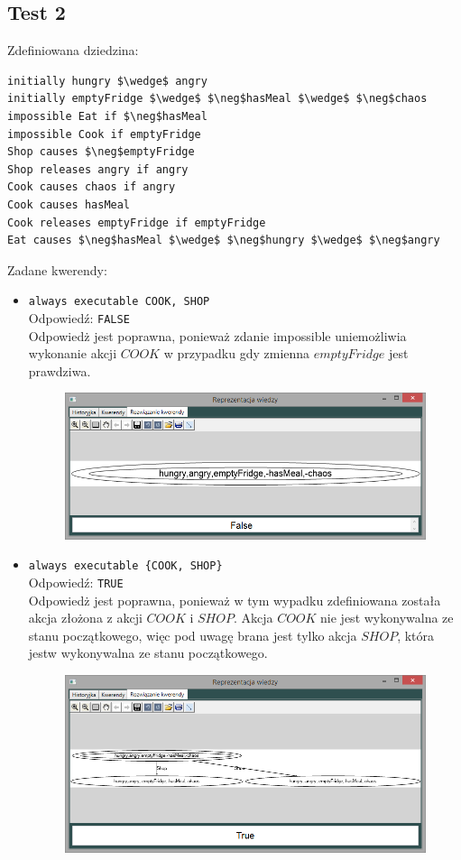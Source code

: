 \documentclass{article}
\begin{document}
\subsection{Test 2}
Zdefiniowana dziedzina:
\bigskip
{}
\begin{lstlisting}[mathescape=true]
initially hungry $\wedge$ angry
initially emptyFridge $\wedge$ $\neg$hasMeal $\wedge$ $\neg$chaos 
impossible Eat if $\neg$hasMeal 
impossible Cook if emptyFridge
Shop causes $\neg$emptyFridge
Shop releases angry if angry
Cook causes chaos if angry
Cook causes hasMeal 
Cook releases emptyFridge if emptyFridge
Eat causes $\neg$hasMeal $\wedge$ $\neg$hungry $\wedge$ $\neg$angry
\end{lstlisting}
\vspace{1cm}
Zadane kwerendy:
\begin{itemize}
    \item {\large\texttt{always executable COOK, SHOP}}\\
    Odpowiedź: \texttt{FALSE}\\
    Odpowiedż jest poprawna, ponieważ zdanie impossible uniemożliwia wykonanie akcji $COOK$ w przypadku gdy zmienna $emptyFridge$ jest prawdziwa.
    \begin{figure}[H]
    \centering
    \includegraphics[scale=0.5]{test2_1}
    \end{figure}
    \item {\large\texttt{always executable \{COOK, SHOP\}}}\\
    Odpowiedź: \texttt{TRUE}\\
    Odpowiedż jest poprawna, ponieważ w tym wypadku zdefiniowana została akcja złożona z akcji $COOK$ i $SHOP$. Akcja $COOK$ nie jest wykonywalna ze stanu początkowego, więc pod uwagę brana jest tylko akcja $SHOP$, która jestw wykonywalna ze stanu początkowego. 
    \begin{figure}[H]
    \centering
    \includegraphics[scale=0.5]{test2_2}

\end{figure}
\end{itemize}
\end{document}
